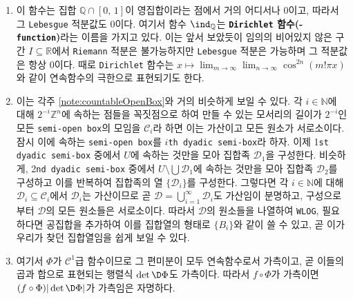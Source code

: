 \begin{enumerate}[label = \textsf{\textbf{\arabic*}}]
    \item 이 함수는 집합 $\mathbb{Q}\cap[0,\,1]$이 영집합이라는 점에서 거의 어디서나 0이고, 따라서 그 \texttt{Lebesgue} 적분값도 $0$이다. 여기서 함수 $\ind_\mathbb{Q}$는 \textbf{\texttt{Dirichlet} 함수(- \texttt{function})}라는 이름을 가지고 있다. 이는 앞서 보았듯이 임의의 비어있지 않은 구간 $I\subseteq\mathbb{R}$에서 \texttt{Riemann} 적분은 불가능하지만 \texttt{Lebesgue} 적분은 가능하며 그 적분값은 항상 $0$이다. 때로 \texttt{Dirichlet} 함수는 $x\mapsto\lim_{m\to\infty}\lim_{n\to\infty}\cos^{2n}(m!\pi x)$와 같이 연속함수의 극한으로 표현되기도 한다.
    \item 이는 각주 \ref{note:countableOpenBox}와 거의 비슷하게 보일 수 있다. 각 $i\in\mathbb{N}$에 대해 $2^{-i}\mathbb{Z}^n$에 속하는 점들을 꼭짓점으로 하여 만들 수 있는 모서리의 길이가 $2^{-i}$인 모든 \texttt{semi-open box}의 모임을 $\mathcal{C}_i$라 하면 이는 가산이고 모든 원소가 서로소이다. 잠시 이에 속하는 \texttt{semi-open box}를 $i$\texttt{th dyadic semi-box}라 하자. 이제 1\texttt{st dyadic semi-box} 중에서 $U$에 속하는 것만을 모아 집합족 $\mathcal{D}_1$을 구성한다. 비슷하게, 2\texttt{nd dyadic semi-box} 중에서 $U\setminus\bigcup\mathcal{D}_1$에 속하는 것만을 모아 집합족 $\mathcal{D}_2$를 구성하고 이를 반복하여 집합족의 열 $\{\mathcal{D}_i\}$를 구성한다. 그렇다면 각 $i\in\mathbb{N}$에 대해 $\mathcal{D}_i\subseteq\mathcal{C}_i$에서 $\mathcal{D}_i$는 가산이므로 곧 $\mathcal{D}=\bigcup_{i=1}^\infty\mathcal{D}_i$도 가산임이 분명하고, 구성으로부터 $\mathcal{D}$의 모든 원소들은 서로소이다. 따라서 $\mathcal{D}$의 원소들을 나열하여 \texttt{WLOG}, 필요하다면 공집합을 추가하여 이를 집합열의 형태로 $\{B_i\}$와 같이 쓸 수 있고, 곧 이가 우리가 찾던 집합열임을 쉽게 보일 수 있다.
    \item 여기서 $\Phi$가 $\mathcal{C}^1$급 함수이므로 그 편미분이 모두 연속함수로서 가측이고, 곧 이들의 곱과 합으로 표현되는 행렬식 $\det\D\Phi$도 가측이다. 따라서 $f\circ\Phi$가 가측이면 $(f\circ\Phi)|\det\D\Phi|$가 가측임은 자명하다.


\end{enumerate}

